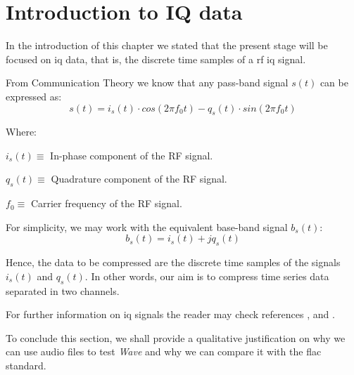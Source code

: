 \section{Introduction to IQ data}

In the introduction of this chapter we stated that the present stage will be focused on \acrshort{iq} data, that is, the discrete time samples of a \acrshort{rf} \acrshort{iq} signal.

From Communication Theory we know that any pass-band signal $s(t)$ can be expressed as:
\begin{equation}
s(t) = i_s(t) \cdot cos(2\pi f_0 t) - q_s(t) \cdot sin(2\pi f_0 t)
\end{equation}

Where:
\begin{description}
	\item $i_s(t) \equiv$ In-phase component of the RF signal.
	\item $q_s(t) \equiv$ Quadrature component of the RF signal.
	\item $f_0 \equiv$ Carrier frequency of the RF signal.
\end{description}

For simplicity, we may work with the equivalent base-band signal $b_s(t)$:
\begin{equation}
	b_s(t) = i_s(t) + j q_s(t)
\end{equation}

Hence, the data to be compressed are the discrete time samples of the signals $i_s(t)$ and $q_s(t)$. In other words, our aim is to compress time series data separated in two channels.

For further information on \acrshort{iq} signals the reader may check references \parencite{IQintro}, \parencite{carlson2010communication} and \parencite{ICOM}.

To conclude this section, we shall provide a qualitative justification on why we can use audio files to test \textit{Wave} and why we can compare it with the \acrshort{flac} standard.

